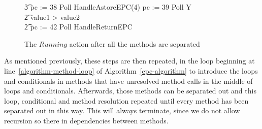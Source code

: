 \begin{figure}[p!]
\begin{circus}
    \t3 pc := 38 \circseq Poll \circseq HandleAstoreEPC(4) \circseq pc := 39 \circseq Poll \circseq Y \\
    \t2 {} \circelse value1 > value2 \circthen \Skip \\
    \t2 \circfi \circseq pc := 42 \circseq Poll \circseq HandleReturnEPC
  \end{circus}
  \caption{The $Running$ action after all the methods are separated}
  \label{final-method-separation-example-figure}
\end{figure}
  
As mentioned previously, these steps are then repeated, in the loop
beginning at line~\ref{algorithm-method-loop} of
Algorithm~\ref{epc-algorithm} to introduce the loops and conditionals
in methods that have unresolved method calls in the middle of loops
and conditionals.
Afterwards, those methods can be separated out and this loop,
conditional and method resolution repeated until every method has been
separated out in this way.
This will always terminate, since we do not allow recursion so there
in dependencies between methods.

